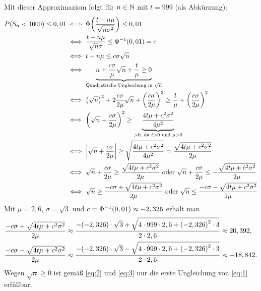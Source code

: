 \documentclass{exercise}
\begin{document}
\begin{enumerate}
\[        \]
        Mit dieser Approximaziom folgt für \(n \in \mathbb{N}\) mit \(t = 999\) (als Abkürzung):
        \begin{align}
            P\parentheses*{S_n < 1000} \le 0,01 &\iff \Phi\parentheses*{\frac{t - n\mu}{\sqrt{n\sigma^2}}} \le 0,01\nonumber\\
            &\iff \frac{t - n\mu}{\sqrt{n}\sigma} \le \Phi^{-1}\parentheses*{0,01} = c\nonumber\\
            &\iff t - n\mu \le c\sigma\sqrt{n}\nonumber\\
            &\iff \underbrace{n + \frac{c\sigma}{\mu}\sqrt{n} + \frac{t}{\mu} \ge 0}_{\text{Quadratische Ungleichung in }\sqrt{n}}\nonumber\\
            &\iff \parentheses*{\sqrt{n}}^2 + 2\frac{c\sigma}{2\mu}\sqrt{n} + \parentheses*{\frac{c\sigma}{2\mu}}^2 \ge \frac{t}{\mu} + \parentheses*{\frac{c\sigma}{2\mu}}^2\nonumber\\
            &\iff \parentheses*{\sqrt{n} + \frac{c\sigma}{2\mu}}^2 \ge \underbrace{\frac{4t\mu + c^2 \sigma^2}{4\mu^2}}_{> 0\text{, da }t > 0\text{ und }\mu > 0}\nonumber\\
            &\iff \absolute*{\sqrt{n} + \frac{c\sigma}{2\mu}} \ge \sqrt{\frac{4t\mu + c^2 \sigma^2}{4\mu^2}} = \frac{\sqrt{4t\mu + c^2 \sigma^2}}{2\mu}\nonumber\\
            &\iff \sqrt{n} + \frac{c\sigma}{2\mu} \ge \frac{\sqrt{4t\mu + c^2 \sigma^2}}{2\mu}\text{ oder }\sqrt{n} + \frac{c\sigma}{2\mu} \le -\frac{\sqrt{4t\mu + c^2 \sigma^2}}{2\mu}\nonumber\\
            &\iff \sqrt{n} \ge \frac{-c\sigma + \sqrt{4t\mu + c^2 \sigma^2}}{2\mu}\text{ oder }\sqrt{n} \le \frac{-c\sigma - \sqrt{4t\mu + c^2 \sigma^2}}{2\mu}\label{eq:1}
        \end{align}
        Mit \(\mu = 2,6\), \(\sigma = \sqrt{3}\) und \(c = \Phi^{-1}\parentheses*{0,01} \approx -2,326\) erhält man
        \begin{align}
            \frac{-c\sigma + \sqrt{4t\mu + c^2 \sigma^2}}{2\mu} & \approx \frac{-\parentheses*{-2,326} \cdot \sqrt{3} + \sqrt{4 \cdot 999 \cdot 2,6 + \parentheses*{-2,326}^2 \cdot 3}}{2 \cdot 2,6} \approx 20,392,\label{eq:2}\\
            \frac{-c\sigma - \sqrt{4t\mu + c^2 \sigma^2}}{2\mu} & \approx \frac{-\parentheses*{-2,326} \cdot \sqrt{3} - \sqrt{4 \cdot 999 \cdot 2,6 + \parentheses*{-2,326}^2 \cdot 3}}{2 \cdot 2,6} \approx -18,842.\label{eq:3}
        \end{align}
        Wegen \(\sqrt{n} \ge 0\) ist gemäß \eqref{eq:2} und \eqref{eq:3} nur die erste Ungleichung von \eqref{eq:1} erfüllbar.

\end{enumerate}
\end{document}
